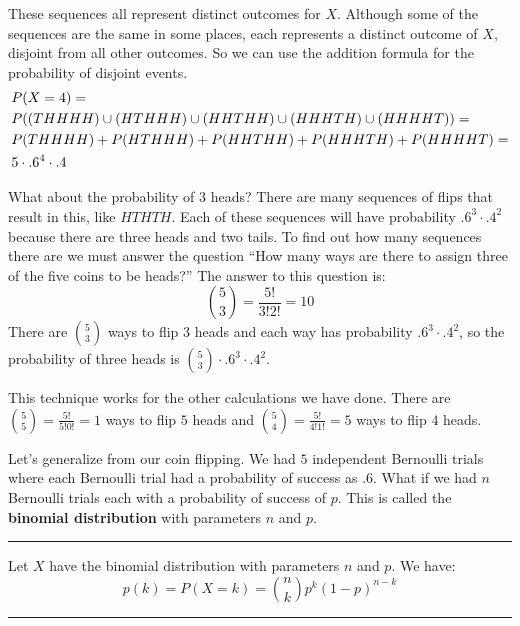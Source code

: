 \documentclass[
]{book}
\theoremstyle{definition}
\theoremstyle{definition}
\theoremstyle{definition}
\theoremstyle{remark}
\let\BeginKnitrBlock\begin \let\EndKnitrBlock\end
\begin{document}
These sequences all represent distinct outcomes for \(X\). Although some of the sequences are the same in some places, each represents a distinct outcome of \(X\), disjoint from all other outcomes. So we can use the addition formula for the probability of disjoint events.
\begin{align} 
&P(X=4) = \notag \\
&P((THHHH) \cup (HTHHH) \cup (HHTHH) \cup (HHHTH) \cup (HHHHT)) = \notag \\
&P(THHHH) + P(HTHHH) + P(HHTHH) + P(HHHTH) + P(HHHHT)=  \notag \\
&5 \cdot .6^4 \cdot .4 \notag
\end{align}

What about the probability of \(3\) heads? There are many sequences of flips that result in this, like \(HTHTH\). Each of these sequences will have probability \(.6^3 \cdot .4^2\) because there are three heads and two tails. To find out how many sequences there are we must answer the question ``How many ways are there to assign three of the five coins to be heads?'' The answer to this question is:
\[{5 \choose 3} = \frac{5!}{3!2!} = 10\]
There are \({5 \choose 3}\) ways to flip \(3\) heads and each way has probability \(.6^3 \cdot .4^2\), so the probability of three heads is \({5 \choose 3} \cdot .6^3 \cdot .4^2\).

This technique works for the other calculations we have done. There are \({5 \choose 5} = \frac{5!}{5!0!}=1\) ways to flip \(5\) heads and \({5 \choose 4} = \frac{5!}{4!1!}=5\) ways to flip \(4\) heads.

Let's generalize from our coin flipping. We had \(5\) independent Bernoulli trials where each Bernoulli trial had a probability of success as \(.6\). What if we had \(n\) Bernoulli trials each with a probability of success of \(p\). This is called the \textbf{binomial distribution} with parameters \(n\) and \(p\).

\begin{center}\rule{0.5\linewidth}{0.5pt}\end{center}

\BeginKnitrBlock{theorem}[Binomial Distribution]
\protect\hypertarget{thm:unnamed-chunk-20}{}{\label{thm:unnamed-chunk-20} {} }Let \(X\) have the binomial distribution with parameters \(n\) and \(p\). We have:
\[p(k) = P(X=k) = {n \choose k}p^k(1-p)^{n-k}\]
\EndKnitrBlock{theorem}

\begin{center}\rule{0.5\linewidth}{0.5pt}\end{center}
\end{document}
